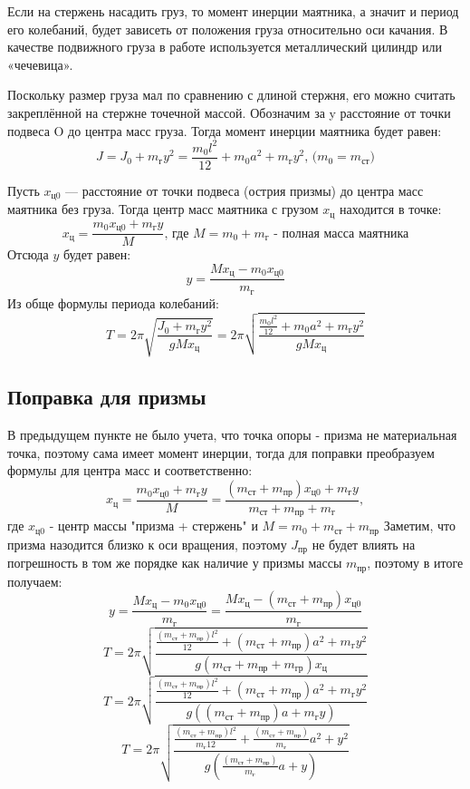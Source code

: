 \documentclass[a4paper]{article}
\begin{document}
Если на стержень насадить груз, то момент инерции маятника, а значит и период его колебаний, будет зависеть от положения груза относительно
оси качания. В качестве подвижного груза в работе используется металлический цилиндр или «чечевица».

Поскольку размер груза мал по сравнению с длиной стержня, его можно
считать закреплённой на стержне точечной массой. Обозначим за y расстояние от точки подвеса O до центра масс груза. Тогда момент
инерции маятника будет равен:
\[J = J_{0} + m_{\text{г}}y^2 = \frac{m_{0}l^2}{12} + m_{0}a^2 + m_{\text{г}}y^2\text{, ($m_{0} = m_{\text{ст}}$)}\]

Пусть $x_{\text{ц0}}$ — расстояние от точки подвеса (острия
призмы) до центра масс маятника без груза. Тогда центр
масс маятника с грузом $x_{\text{ц}}$ находится в точке:
\[x_{\text{ц}} = \frac{m_{0}x_{\text{ц0}} + m_{\text{г}}y}{M}\text{, где $M = m_{0} + m_{\text{г}}$ - полная масса маятника}\]
Отсюда $y$ будет равен:
\[y = \frac{M x_{\text{ц}} - m_{0}x_{\text{ц0}}}{m_{\text{г}}}\]
Из обще формулы периода колебаний:
\[T = 2\pi \sqrt{\frac{J_{0} + m_{\text{г}}y^2}{gM x_{\text{ц}}}} = 2\pi \sqrt{\frac{\frac{m_{0}l^2}{12} + m_{0}a^2 + m_{\text{г}}y^2}{gM x_{\text{ц}}}}\]

\subsection{Поправка для призмы}
В предыдущем пункте не было учета, что точка опоры - призма не материальная точка, поэтому сама имеет момент инерции, тогда для поправки преобразуем формулы для центра масс и соответственно:
\[x_{\text{ц}} = \frac{m_{0}x_{\text{ц0}} + m_{\text{г}}y}{M} = \frac{(m_{\text{ст}} + m_{\text{пр}})x_{\text{ц0}} + m_{\text{г}}y}{m_{\text{ст}} + m_{\text{пр}} + m_{\text{г}}},\]
где $x_{\text{ц0}}$ - центр массы "призма + стержень" и $M = m_{0} + m_{\text{ст}} + m_{\text{пр}}$ 
\newline 
\newline 
Заметим, что призма назодится близко к оси вращения, поэтому $J_{\text{пр}}$ не будет влиять на погрешность в том же порядке как наличие у призмы массы $m_{\text{пр}}$, поэтому в итоге получаем:
\[y = \frac{M x_{\text{ц}} - m_{0}x_{\text{ц0}}}{m_{\text{г}}} = \frac{M x_{\text{ц}} - (m_{\text{ст}} + m_{\text{пр}})x_{\text{ц0}}}{m_{\text{г}}}\]
\[T = 2\pi \sqrt{\frac{\frac{(m_{\text{ст}} + m_{\text{пр}})l^2}{12} + (m_{\text{ст}} + m_{\text{пр}})a^2 + m_{\text{г}}y^2}{g (m_{\text{ст}} + m_{\text{пр}} + m_{\text{гр}}) x_{\text{ц}}}}\]
\[T = 2\pi \sqrt{\frac{\frac{(m_{\text{ст}} + m_{\text{пр}})l^2}{12} + (m_{\text{ст}} + m_{\text{пр}})a^2 + m_{\text{г}}y^2}{g ((m_{\text{ст}} + m_{\text{пр}})a + m_{\text{г}}y)}}\]
\[T = 2\pi \sqrt{\frac{\frac{(m_{\text{ст}} + m_{\text{пр}})l^2}{m_{\text{г}}12} + \frac{(m_{\text{ст}} + m_{\text{пр}})}{m_{\text{г}}}a^2 + y^2}{g \left( \frac{(m_{\text{ст}} + m_{\text{пр}})}{m_{\text{г}}}a + y \right) }}\]
\end{document}
